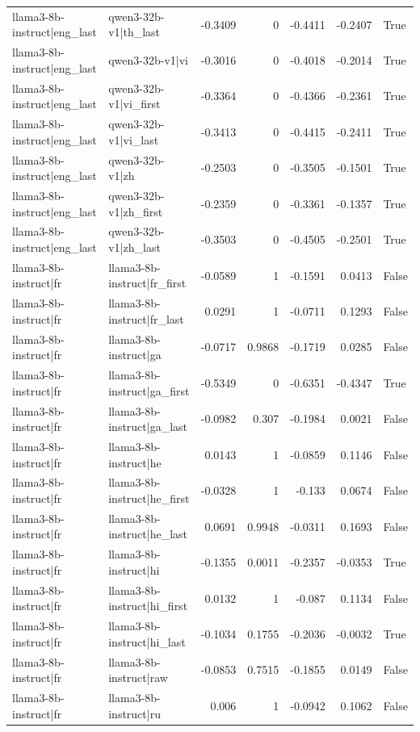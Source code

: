 \begin{table}
\begin{tabular}{l l r r r r l}
llama3-8b-instruct|eng_last & qwen3-32b-v1|th_last & -0.3409 & 0 & -0.4411 & -0.2407 & True \\
llama3-8b-instruct|eng_last & qwen3-32b-v1|vi & -0.3016 & 0 & -0.4018 & -0.2014 & True \\
llama3-8b-instruct|eng_last & qwen3-32b-v1|vi_first & -0.3364 & 0 & -0.4366 & -0.2361 & True \\
llama3-8b-instruct|eng_last & qwen3-32b-v1|vi_last & -0.3413 & 0 & -0.4415 & -0.2411 & True \\
llama3-8b-instruct|eng_last & qwen3-32b-v1|zh & -0.2503 & 0 & -0.3505 & -0.1501 & True \\
llama3-8b-instruct|eng_last & qwen3-32b-v1|zh_first & -0.2359 & 0 & -0.3361 & -0.1357 & True \\
llama3-8b-instruct|eng_last & qwen3-32b-v1|zh_last & -0.3503 & 0 & -0.4505 & -0.2501 & True \\
llama3-8b-instruct|fr & llama3-8b-instruct|fr_first & -0.0589 & 1 & -0.1591 & 0.0413 & False \\
llama3-8b-instruct|fr & llama3-8b-instruct|fr_last & 0.0291 & 1 & -0.0711 & 0.1293 & False \\
llama3-8b-instruct|fr & llama3-8b-instruct|ga & -0.0717 & 0.9868 & -0.1719 & 0.0285 & False \\
llama3-8b-instruct|fr & llama3-8b-instruct|ga_first & -0.5349 & 0 & -0.6351 & -0.4347 & True \\
llama3-8b-instruct|fr & llama3-8b-instruct|ga_last & -0.0982 & 0.307 & -0.1984 & 0.0021 & False \\
llama3-8b-instruct|fr & llama3-8b-instruct|he & 0.0143 & 1 & -0.0859 & 0.1146 & False \\
llama3-8b-instruct|fr & llama3-8b-instruct|he_first & -0.0328 & 1 & -0.133 & 0.0674 & False \\
llama3-8b-instruct|fr & llama3-8b-instruct|he_last & 0.0691 & 0.9948 & -0.0311 & 0.1693 & False \\
llama3-8b-instruct|fr & llama3-8b-instruct|hi & -0.1355 & 0.0011 & -0.2357 & -0.0353 & True \\
llama3-8b-instruct|fr & llama3-8b-instruct|hi_first & 0.0132 & 1 & -0.087 & 0.1134 & False \\
llama3-8b-instruct|fr & llama3-8b-instruct|hi_last & -0.1034 & 0.1755 & -0.2036 & -0.0032 & True \\
llama3-8b-instruct|fr & llama3-8b-instruct|raw & -0.0853 & 0.7515 & -0.1855 & 0.0149 & False \\
llama3-8b-instruct|fr & llama3-8b-instruct|ru & 0.006 & 1 & -0.0942 & 0.1062 & False \\

\end{tabular}
\end{table}
